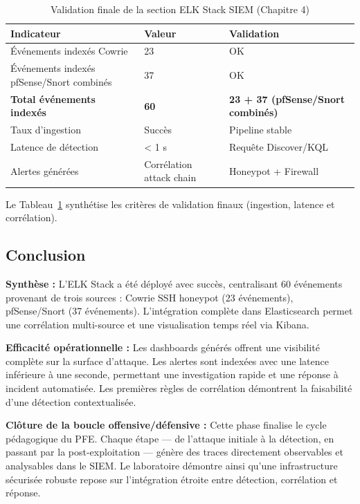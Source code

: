 \documentclass[12pt,a4paper,openany]{report}
\newcommand{\tableheadcolor}{\rowcolor{tableheadbg}}
\begin{document}
	\begin{table}[H]
		\centering
		\small
		\renewcommand{\arraystretch}{1.25}
		\begin{tabular}{p{4.8cm} p{3.1cm} p{3.8cm}}
			\arrayrulecolor{tableborder}
			\hline
			\tableheadcolor
			\textcolor{tableheadfg}{\textbf{Indicateur}} &
			\textcolor{tableheadfg}{\textbf{Valeur}} &
			\textcolor{tableheadfg}{\textbf{Validation}} \\
			\hline
			\rowcolor{tablerowalt}
			Événements indexés Cowrie & 23 & OK \\
			Événements indexés pfSense/Snort combinés & 37 & OK \\
			\rowcolor{tablerowalt}
			\textbf{Total événements indexés} & \textbf{60} & \textbf{23 + 37 (pfSense/Snort combinés)} \\
			Taux d'ingestion & Succès & Pipeline stable \\
			\rowcolor{tablerowalt}
			Latence de détection & \textless{} 1 s & Requête Discover/KQL \\
			Alertes générées & Corrélation attack chain & Honeypot + Firewall \\
			\hline
		\end{tabular}
		\caption{Validation finale de la section ELK Stack SIEM (Chapitre 4)}
		\label{tab:elk-validation-finale}
	\end{table}
	Le Tableau~\ref{tab:elk-validation-finale} synthétise les critères de validation finaux (ingestion, latence et corrélation).
	
	\subsection{Conclusion}
	\label{sec:elk-conclusion}
	
	\textbf{Synthèse :} L'ELK Stack a été déployé avec succès, centralisant 60 événements provenant de trois sources : Cowrie SSH honeypot (23 événements), pfSense/Snort (37 événements). L'intégration complète dans Elasticsearch permet une corrélation multi-source et une visualisation temps réel via Kibana.
	
	\textbf{Efficacité opérationnelle :} Les dashboards générés offrent une visibilité complète sur la surface d'attaque. Les alertes sont indexées avec une latence inférieure à une seconde, permettant une investigation rapide et une réponse à incident automatisée. Les premières règles de corrélation démontrent la faisabilité d'une détection contextualisée.
	
	\textbf{Clôture de la boucle offensive/défensive :} Cette phase finalise le cycle pédagogique du PFE. Chaque étape — de l'attaque initiale à la détection, en passant par la post-exploitation — génère des traces directement observables et analysables dans le SIEM. Le laboratoire démontre ainsi qu'une infrastructure sécurisée robuste repose sur l'intégration étroite entre détection, corrélation et réponse.
	
\end{document}
